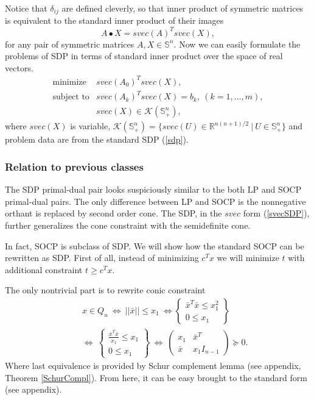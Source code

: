 \documentclass[10pt,oneside]{book}
\theoremstyle{definition}
\begin{document}
Notice that $\delta_{ij}$ are defined cleverly, so that inner product of symmetric matrices is equivalent to the standard inner product of their images
\begin{equation}
A\bullet X= svec(A)^Tsvec(X), 
\end{equation}
for any pair of symmetric matrices $A,X\in \mathbb{S}^n.$  Now we can easily formulate the problems of SDP in terms of standard inner product over the space of real vectors. 
\begin{equation}
\label{svecSDP}
\begin{array}{ll}
\mbox{minimize} & svec(A_0)^T svec(X),\\
\mbox{subject to}& svec(A_k)^T svec(X)  = b_k, \ (k = 1,\dots ,m), \\
& svec(X) \in \mathcal{K}(\mathbb{S}^n_+),
\end{array}
\end{equation}
where $svec(X)$ is variable,  $\mathcal{K}(\mathbb{S}^n_+) = \{svec(U)\in \mathbb{R}^{n(n+1)/2}\ |\ U\in \mathbb{S}^n_+\}$ 
and problem data are from the standard SDP (\ref{sdp}).


\subsubsection{Relation to previous classes}
The  SDP primal-dual pair looks suspiciously similar to the both LP and SOCP primal-dual pairs. 
The only difference between LP and SOCP is the nonnegative orthant is replaced by second order cone. 
The SDP, in the $svec$ form (\ref{svecSDP}), further generalizes the cone constraint with the semidefinite cone.

In fact, SOCP is subclass of SDP. We will show how the standard SOCP can be rewritten as SDP.
First of all, instead of minimizing $c^Tx$ we will minimize $t$ with additional constraint $t\geq c^Tx$. 

The only nontrivial part is to rewrite conic constraint 
\begin{eqnarray}
& &x\in Q_n \ \Leftrightarrow  \ ||\bar{x}||\leq x_1 \ \Leftrightarrow  
\left\lbrace \begin{array}{r}
\bar{x}^T\bar{x}\leq x_1^2\\
0\leq x_1 
\end{array}\right\rbrace \\
 & &\Leftrightarrow \ 
 \left\lbrace \begin{array}{r}
\frac{\bar{x}^T\bar{x}}{x_1}\leq x_1\\
0\leq x_1 
\end{array}\right\rbrace 
 \ \Leftrightarrow  \ 
 \left( \begin{array}{cc}
x_1 & \bar{x}^T\\
\bar{x} & x_1I_{n-1}
\end{array}\right)\succeq 0.
\label{arrowx}
\end{eqnarray}
Where last equivalence is provided by Schur complement lemma (see appendix, Theorem \ref{SchurCompl}).
From here, it can be easy brought to the standard form (see appendix). 
\end{document}
